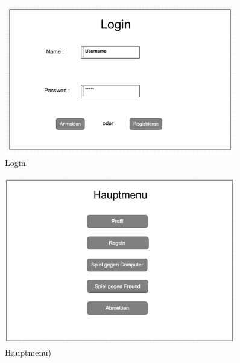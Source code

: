 \begin{figure}
	\centering
	\includegraphics[width=0.9\textwidth]{img/login}
	\caption{Login}
	\label{gui:login}
\end{figure}

\begin{figure}
	\centering
	\includegraphics[width=0.9\textwidth]{img/Hauptmenu}
	\caption{Hauptmenu)}
	\label{gui:hauptmenu}
\end{figure}



